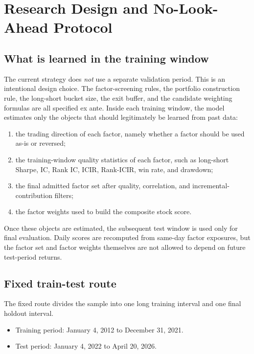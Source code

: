 \documentclass[11pt]{article}
\begin{document}
\section{Research Design and No-Look-Ahead Protocol}

\subsection{What is learned in the training window}

The current strategy does \emph{not} use a separate validation period. This is an intentional design choice. The factor-screening rules, the portfolio construction rule, the long-short bucket size, the exit buffer, and the candidate weighting formulas are all specified ex ante. Inside each training window, the model estimates only the objects that should legitimately be learned from past data:

\begin{enumerate}
    \item the trading direction of each factor, namely whether a factor should be used as-is or reversed;
    \item the training-window quality statistics of each factor, such as long-short Sharpe, IC, Rank IC, ICIR, Rank-ICIR, win rate, and drawdown;
    \item the final admitted factor set after quality, correlation, and incremental-contribution filters;
    \item the factor weights used to build the composite stock score.
\end{enumerate}

Once these objects are estimated, the subsequent test window is used only for final evaluation. Daily scores are recomputed from same-day factor exposures, but the factor set and factor weights themselves are not allowed to depend on future test-period returns.

\subsection{Fixed train-test route}

The fixed route divides the sample into one long training interval and one final holdout interval.

\begin{itemize}
    \item Training period: January 4, 2012 to December 31, 2021.
    \item Test period: January 4, 2022 to April 20, 2026.
\end{itemize}
\end{document}
